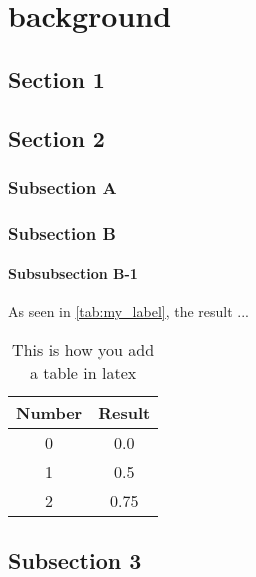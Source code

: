 \chapter{background}
\label{chap:2_background}

\lipsum[2-4]

\section{Section 1}
\lipsum[5-6]

\section{Section 2}
    \lipsum[7]
    
    \subsection{Subsection A}
    \lipsum[8]
    
    \subsection{Subsection B}
    \lipsum[9]
    
        \subsubsection{Subsubsection B-1}
        
        As seen in \autoref{tab:my_label}, the result ...
        
        \begin{table}[h]    %
            \centering
            \caption{This is how you add a table in latex}  
            \label{tab:my_label}    %
            \begin{tabular}{c|c}    %
                Number & Result \\ \toprule
                0 & 0.0 \\
                1 & 0.5 \\
                2 & 0.75 \\
            \end{tabular}
        \end{table}
        
\section{Subsection 3}
\lipsum[11]